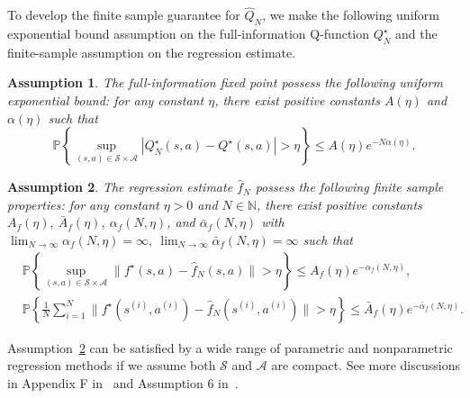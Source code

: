\documentclass[letterpaper, 10 pt, conference]{ieeeconf}  %
\newtheorem{assumption}{Assumption}
\begin{document}
To develop the finite sample guarantee for $\hat{Q}_N$, we make the following uniform exponential bound assumption on the full-information Q-function $Q_N^\star$ and the finite-sample assumption on the regression estimate.
\begin{assumption}\label{ass:Q* - Q constant}
The full-information fixed point possess the following uniform exponential bound: for any constant $\eta$, there exist positive constants $A(\eta)$ and $\alpha(\eta)$ such that 
$$\mathbb P\left\{\sup_{(s,a) \in \mathcal{S}\times \mathcal{A}} |Q_N^\star(s,a) - Q^\star(s,a)| > \eta\right\} \le A(\eta) e^{-N \alpha(\eta)}.$$
\end{assumption} 

\begin{assumption}\label{ass:regression constant}
The regression estimate $\hat{f}_N$ possess the following finite sample properties: for any constant $\eta>0$ and $N\in\mathbb N$, there exist positive constants $A_f(\eta),\ \bar{A}_f(\eta),\ \alpha_f(N,\eta)$, and $\bar{\alpha}_f(N,\eta)$ with $\lim_{N \to\infty} \alpha_f(N,\eta) = \infty,\ \lim_{N \to\infty}\bar{\alpha}_f(N,\eta) = \infty$ such that
\footnotesize
\begin{align*}
& \mathbb P\left\{\sup_{(s,a) \in \mathcal S \times \mathcal A}\|f^\star(s,a) - \hat{f}_N(s,a)\| > \eta\right\} \le A_f(\eta)e^{-\alpha_f(N,\eta)},\\ 
& \mathbb P\left\{\frac{1}{N} \sum_{i=1}^N \|f^\star(s^{(i)},a^{(i)}) - \hat{f}_N(s^{(i)},a^{(i)})\| > \eta\right\} \le \bar{A}_f(\eta)e^{-\bar{\alpha}_f(N,\eta)}.
\end{align*}
\normalsize
\end{assumption}

Assumption\ \ref{ass:regression constant} can be satisfied by a wide range of parametric and nonparametric regression methods if we assume both $\mathcal S$ and $\mathcal A$ are compact. See more discussions in Appendix F in\ \cite{kannan2025data} and Assumption 6 in\ \cite{zhu2024residuals}. 
\end{document}
